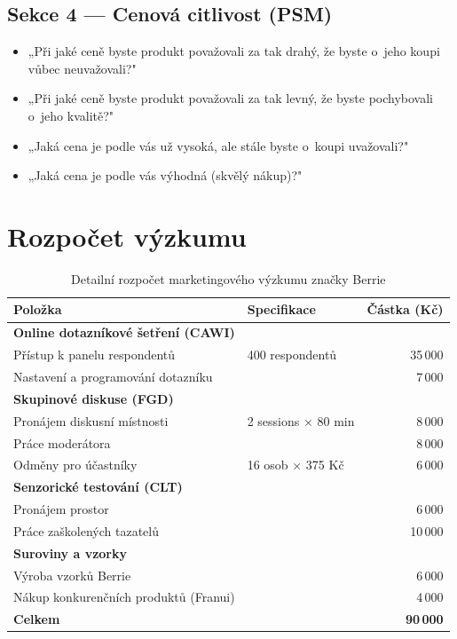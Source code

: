 \section*{Sekce 4 — Cenová citlivost (PSM)}
\begin{itemize}
  \item „Při jaké ceně byste produkt považovali za tak drahý, že byste o~jeho koupi vůbec neuvažovali?"
  \item „Při jaké ceně byste produkt považovali za tak levný, že byste pochybovali o~jeho kvalitě?"
  \item „Jaká cena je podle vás už vysoká, ale stále byste o~koupi uvažovali?"
  \item „Jaká cena je podle vás výhodná (skvělý nákup)?"
\end{itemize}

\chapter{Rozpočet výzkumu}
\label{app:budget}

\begin{table}[H]
\centering
\caption{Detailní rozpočet marketingového výzkumu značky Berrie}
\label{tab:budget_detail}
\begin{tabularx}{\textwidth}{Xlr}
\toprule
\textbf{Položka} & \textbf{Specifikace} & \textbf{Částka (Kč)} \\
\midrule
\multicolumn{3}{l}{\textbf{Online dotazníkové šetření (CAWI)}} \\
\quad Přístup k panelu respondentů & 400 respondentů & 35\,000 \\
\quad Nastavení a programování dotazníku & & 7\,000 \\
\midrule
\multicolumn{3}{l}{\textbf{Skupinové diskuse (FGD)}} \\
\quad Pronájem diskusní místnosti & 2 sessions × 80 min & 8\,000 \\
\quad Práce moderátora & & 8\,000 \\
\quad Odměny pro účastníky & 16 osob × 375 Kč & 6\,000 \\
\midrule
\multicolumn{3}{l}{\textbf{Senzorické testování (CLT)}} \\
\quad Pronájem prostor & & 6\,000 \\
\quad Práce zaškolených tazatelů & & 10\,000 \\
\midrule
\multicolumn{3}{l}{\textbf{Suroviny a vzorky}} \\
\quad Výroba vzorků Berrie & & 6\,000 \\
\quad Nákup konkurenčních produktů (Franui) & & 4\,000 \\
\midrule
\textbf{Celkem} & & \textbf{90\,000} \\
\bottomrule
\end{tabularx}
\end{table}
